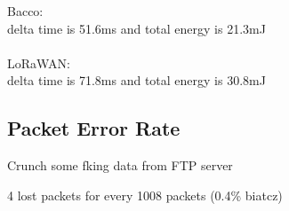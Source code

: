 Bacco:\\
delta time is 51.6ms and total energy is 21.3mJ
\\\\
LoRaWAN:\\
delta time is 71.8ms and total energy is 30.8mJ

\subsection{Packet Error Rate}
Crunch some fking data from FTP server

4 lost packets for every 1008 packets (0.4\% biatcz)
